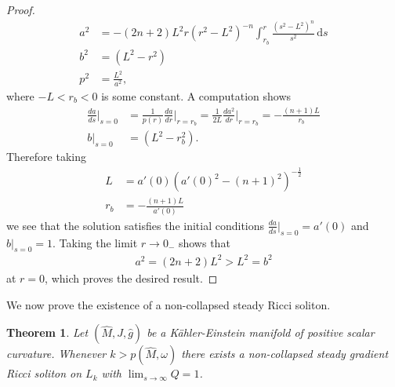 \documentclass{amsart}
\newtheorem{thm}{Theorem}[section]
\theoremstyle{definition}
\theoremstyle{remark}
\numberwithin{equation}{section}
\begin{document}
\begin{proof}
\begin{align*}
a^2 &= -(2n+2)L^2r(r^2-L^2)^{-n}\int_{r_b}^r \frac{(s^2-L^2)^n}{s^2} \, \mathrm{d}s \\
b^2 &=(L^2-r^2) \\
p^2 &= \frac{L^2}{a^2},
\end{align*}
where $ -L < r_b < 0$ is some constant. A computation shows
\begin{align*}
\frac{da}{ds}\Big|_{s=0} &= \frac{1}{p(r)} \frac{da}{dr}\Big|_{r=r_b} = \frac{1}{2L} \frac{da^2}{dr}\Big|_{r=r_b} = -\frac{(n+1)L}{r_b} \\
b|_{s=0} &= (L^2 - r_b^2).
\end{align*}
Therefore taking 
\begin{align*}
L &= a'(0)\left( a'(0)^2- (n+1)^2 \right)^{-\frac{1}{2}}\\
r_b &= -\frac{(n+1)L}{a'(0)}
\end{align*}
we see that the solution satisfies the initial conditions $\frac{da}{ds} \big|_{s=0} = a'(0)$ and $b\big|_{s=0} = 1$. Taking the limit $r \rightarrow 0_-$ shows that 
\begin{align*}
a^2 = (2n+2) L^2 > L^2 = b^2
\end{align*}
at $r=0$, which proves the desired result.
\end{proof}

We now prove the existence of a non-collapsed steady Ricci soliton.


\begin{thm}
Let $(\hat{M}, J, \hat{g})$ be a K\"ahler-Einstein manifold of positive scalar curvature. Whenever $k > p(\hat{M}, \omega)$ there exists a non-collapsed steady gradient Ricci soliton on $L_{k}$ with $\lim_{s\rightarrow\infty} Q = 1$.
\end{thm}
\end{document}
